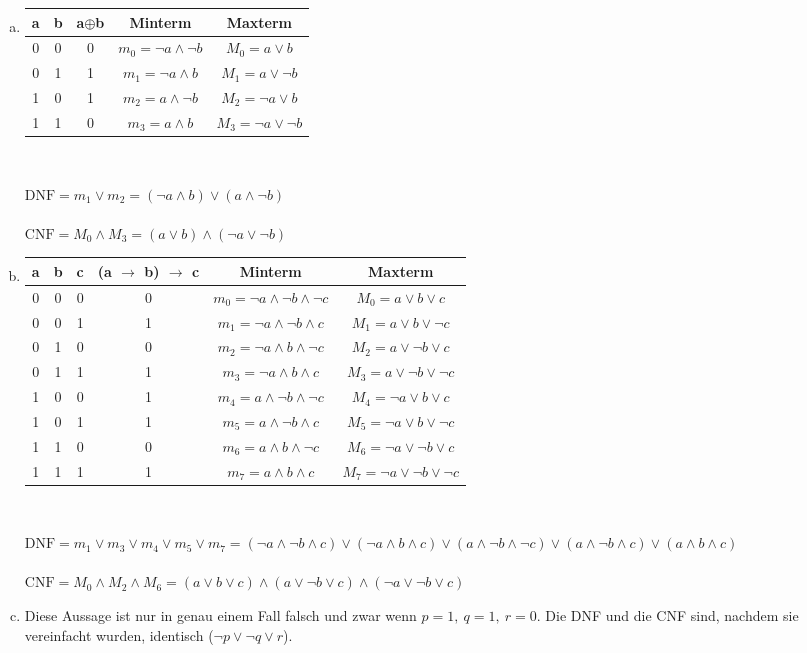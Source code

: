\documentclass[12pt,a4paper]{article}
\begin{document}
\begin{enumerate}[a)]
\item
\begin{tabular}{c|c|c|c|c}
a & b & a$\oplus$b & Minterm & Maxterm\\
\hline
0 & 0 & 0 & $m_0 = \neg a \land \neg b$& $M_0 = a \lor b$\\
0 & 1 & 1 & $m_1 = \neg a \land b$& $M_1 = a \lor \neg b$\\
1 & 0 & 1 & $m_2 = a \land \neg b$& $M_2 = \neg a \lor b$\\
1 & 1 & 0 & $m_3 = a \land b$ & $M_3=\neg a \lor \neg b$\\
\end{tabular}\\

\vspace{10pt}

$\text{DNF}=m_1 \lor m_2 =(\neg a \land b) \lor (a \land \neg b)$\\
\\
$\text{CNF} = M_0 \land M_3 =(a \lor b) \land (\neg a \lor \neg b)$\\

\item
\begin{tabular}{c|c|c|c|c|c}
a & b & c & (a $\rightarrow$ b) $\rightarrow$ c & Minterm & Maxterm\\
\hline
0 & 0 & 0 & 0 & $m_0=\neg a \land \neg b \land \neg c$&$M_0=a \lor b \lor c$\\
0 & 0 & 1 & 1 & $m_1=\neg a \land \neg b \land c$ & $M_1=a \lor b \lor \neg c$\\
0 & 1 & 0 & 0 & $m_2=\neg a \land b \land \neg c$ & $M_2=a \lor \neg b \lor c$\\
0 & 1 & 1 & 1 & $m_3=\neg a \land b \land c$ & $M_3= a \lor \neg b \lor \neg c$\\
1 & 0 & 0 & 1 & $m_4=a \land \neg b \land \neg c$ & $M_4=\neg a \lor b \lor c$\\
1 & 0 & 1 & 1 & $m_5=a \land \neg b \land c$ & $M_5=\neg a \lor b \lor \neg c$\\
1 & 1 & 0 & 0 & $m_6=a \land b \land \neg c$ & $M_6=\neg a \lor \neg b \lor c$\\
1 & 1 & 1 & 1 & $m_7=a \land b \land c$ & $M_7=\neg a \lor \neg b \lor \neg c$\\
\end{tabular}\\

\vspace{10pt}

$\text{DNF} = m_1 \lor m_3 \lor m_4 \lor m_5 \lor m_7 = (\neg a \land \neg b \land c)\lor (\neg a \land b \land c)\lor (a \land \neg b \land \neg c)\lor (a \land \neg b \land c)\lor (a \land b \land c)$\\
\\
$\text{CNF} = M_0 \land M_2 \land M_6 = (a \lor b \lor c)\land (a \lor \neg b \lor c)\land (\neg a \lor \neg b \lor c)$\\
\item Diese Aussage ist nur in genau einem Fall falsch und zwar wenn $p = 1,~q = 1,~ r = 0$. Die DNF und die CNF sind, nachdem sie vereinfacht wurden, identisch  ($\neg p \lor \neg q \lor r$).
\end{enumerate}
\end{document}
